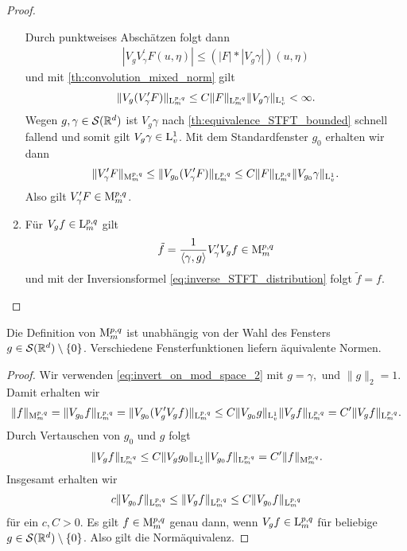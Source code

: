 \begin{proof}
\begin{enumerate}[label =\textbf{(\roman*)}]
		Durch punktweises Abschätzen folgt dann
		\begin{align}\label{eq:invert_on_mod_space_1}
		|V_g V^\prime_\gamma F(u , \eta)|
		\leq 
		(| F | \ast |V_g \gamma |)(u,\eta)
		\end{align}
		und mit \ref{th:convolution_mixed_norm} gilt 
		\begin{align}\label{eq:invert_on_mod_space_2}
		\| V_g( V^\prime_\gamma F) \|_{\mathrm{L}^{p,q}_m}
		\leq 
		C \| F\|_{\mathrm{L}^{p,q}_m} \| V_g \gamma\|_{\mathrm{L}^1_v} < \infty.
		\end{align}
		Wegen $ g, \gamma \in \mathcal{S}(\mathbb{R}^d) $ ist $ V_g \gamma $ nach \ref{th:equivalence_STFT_bounded} schnell fallend und somit gilt $ V_g \gamma \in \mathrm{L}^1_v $.  
		Mit dem Standardfenster $ g_0  $ erhalten wir dann
		\begin{align*}
		\| V_\gamma^\prime F\|_{\mathrm{M}^{p,q}_m}
		\leq 
		\|V_{g_0}(V_\gamma^\prime F) \|_{\mathrm{L}_m^{p,q}}
		\leq
		C \| F \|_{\mathrm{L}_m^{p,q}} \| V_{g_0} \gamma \|_{\mathrm{L}^1_v}.
		\end{align*}
		Also gilt $ V_\gamma^\prime F \in \mathrm{M}_m^{p,q} $.
		
		\item
		Für $ V_g f \in \mathrm{L}_m^{p,q} $ gilt 
		\begin{align*}
		\tilde{f} = \frac{1}{\langle \gamma, g \rangle} V_\gamma^\prime V_g f  \in \mathrm{M}_m^{p,q}
		\end{align*}
		und mit der Inversionsformel \eqref{eq:inverse_STFT_distribution} folgt $ \tilde{f} = f $.
	\end{enumerate}
\end{proof}

\begin{sz}\label{th:independence_of_window_norm}
	Die Definition von $ \mathrm{M}_m^{p,q} $ ist  unabhängig von der Wahl des Fensters $ g \in \mathcal{S}(\mathbb{R}^d)  \setminus \{ 0\}$. Verschiedene Fensterfunktionen liefern äquivalente Normen.
\end{sz}

\begin{proof}
	Wir verwenden \eqref{eq:invert_on_mod_space_2} mit $ g = \gamma,  $ und $ \| g \|_2 = 1 $. Damit erhalten wir
	\begin{align*}
	\| f \|_{\mathrm{M}_m^{p,q}}
	=
	\| V_{g_0} f \|_{\mathrm{L}_m^{p,q}}
	=
	\| V_{g_0} (V_g^\prime V_g f) \|_{\mathrm{L}_m^{p,q}}
	\leq 
	C 
	\| V_{g_0} g \|_{\mathrm{L}^1_v}
	\| V_g f \|_{\mathrm{L}_m^{p,q}}
	=
	C^\prime \| V_g f \|_{\mathrm{L}_m^{p,q} }.
	\end{align*}
	Durch Vertauschen von $ g_0 $ und $ g $ folgt
	\begin{align*}
	\| V_g f \|_{\mathrm{L}_m^{p,q}}
	\leq 
	C \| V_g g_0 \|_{\mathrm{L}^1_v}
	\| V_{g_0 } f \|_{\mathrm{L}_m^{p,q}} =
	C^\prime \| f \|_{\mathrm{M}_m^{p,q}}. 
	\end{align*}
	Insgesamt erhalten wir 
	\begin{align*}
	c \| V_{g_0} f \|_{\mathrm{L}_m^{p,q}}
	\leq
	\| V_g f \|_{\mathrm{L}_m^{p,q}}
	\leq
	C \| V_{g_0} f \|_{\mathrm{L}_m^{p,q}}
	\end{align*}
	für ein $ c,C > 0 $. Es gilt $ f \in \mathrm{M}^{p,q}_m $ genau dann, wenn $ V_g f \in \mathrm{L}_m^{p,q} $ für beliebige $ g \in \mathcal{S}(\mathbb{R}^d) \setminus \{0\} $.
	Also gilt die Normäquivalenz.
\end{proof}

